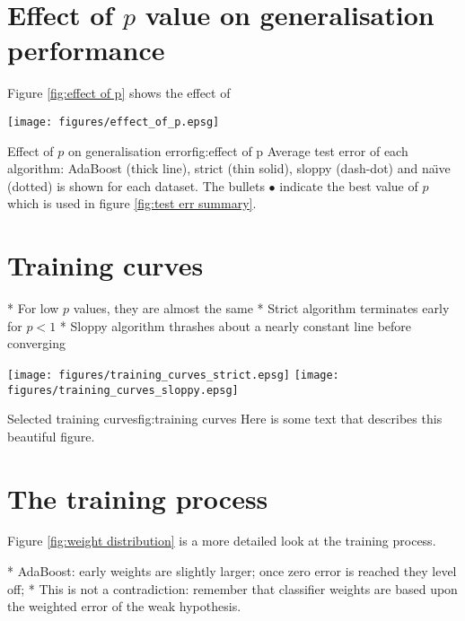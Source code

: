\section{Effect of $p$ value on generalisation performance}

Figure \ref{fig:effect of p} shows the effect of 

\begin{linefigure}
\begin{center}
\texttt{[image: figures/effect\_of\_p.epsg]}
\end{center}
\begin{capt}{Effect of $p$ on generalisation error}{fig:effect of p}
Average test error of each algorithm: AdaBoost (thick line), strict
(thin solid), sloppy (dash-dot) and na\"{\i}ve (dotted) is shown for
each dataset.  The bullets $\bullet$ indicate the best value of $p$
which is used in figure \ref{fig:test err summary}.
\end{capt}
\end{linefigure}

\section{Training curves}

* For low $p$ values, they are almost the same
* Strict algorithm terminates early for $p < 1$
* Sloppy algorithm thrashes about a nearly constant line before
  converging


\begin{linefigure}
\begin{center}
\texttt{[image: figures/training\_curves\_strict.epsg]}
\texttt{[image: figures/training\_curves\_sloppy.epsg]}
\end{center}
\begin{capt}{Selected training curves}{fig:training curves} 
Here is some text that describes this beautiful figure.
\end{capt}
\end{linefigure}

\section{The training process}

Figure \ref{fig:weight distribution} is a more detailed look at the
training process.

* AdaBoost: early weights are slightly larger; once zero error is
  reached they level off;
* This is not a contradiction: remember that classifier weights are
  based upon the weighted error of the weak hypothesis.

